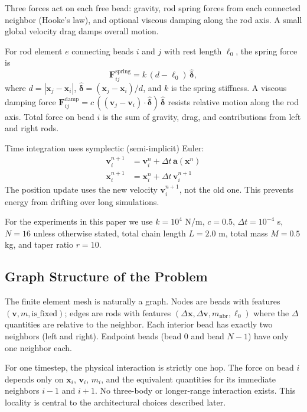 \documentclass[conference]{IEEEtran}
\begin{document}
Three forces act on each free bead: gravity, rod spring forces from each connected neighbor (Hooke's law), and optional viscous damping along the rod axis. A small global velocity drag damps overall motion.

For rod element $e$ connecting beads $i$ and $j$ with rest length $\ell_0$, the spring force is
\begin{equation}
    \mathbf{F}_{ij}^{\text{spring}} = k \, (d - \ell_0) \, \hat{\boldsymbol{\delta}},
    \label{eq:spring}
\end{equation}
where $d = |\mathbf{x}_j - \mathbf{x}_i|$, $\hat{\boldsymbol{\delta}} = (\mathbf{x}_j - \mathbf{x}_i)/d$, and $k$ is the spring stiffness. A viscous damping force $\mathbf{F}_{ij}^{\text{damp}} = c \, ((\mathbf{v}_j - \mathbf{v}_i) \cdot \hat{\boldsymbol{\delta}}) \, \hat{\boldsymbol{\delta}}$ resists relative motion along the rod axis. Total force on bead $i$ is the sum of gravity, drag, and contributions from left and right rods.

Time integration uses symplectic (semi-implicit) Euler:
\begin{align}
    \mathbf{v}_i^{n+1} &= \mathbf{v}_i^n + \Delta t \, \mathbf{a}(\mathbf{x}^n) \label{eq:symp_v}\\
    \mathbf{x}_i^{n+1} &= \mathbf{x}_i^n + \Delta t \, \mathbf{v}_i^{n+1} \label{eq:symp_x}
\end{align}
The position update uses the new velocity $\mathbf{v}_i^{n+1}$, not the old one. This prevents energy from drifting over long simulations.

For the experiments in this paper we use $k = 10^4$ N/m, $c = 0.5$, $\Delta t = 10^{-4}$ s, $N = 16$ unless otherwise stated, total chain length $L = 2.0$ m, total mass $M = 0.5$ kg, and taper ratio $r = 10$.

\subsection{Graph Structure of the Problem}

The finite element mesh is naturally a graph. Nodes are beads with features $(\mathbf{v}, m, \text{is\_fixed})$; edges are rods with features $(\Delta\mathbf{x}, \Delta\mathbf{v}, m_{\text{nbr}}, \ell_0)$ where the $\Delta$ quantities are relative to the neighbor. Each interior bead has exactly two neighbors (left and right). Endpoint beads (bead 0 and bead $N-1$) have only one neighbor each.

For one timestep, the physical interaction is strictly one hop. The force on bead $i$ depends only on $\mathbf{x}_i$, $\mathbf{v}_i$, $m_i$, and the equivalent quantities for its immediate neighbors $i-1$ and $i+1$. No three-body or longer-range interaction exists. This locality is central to the architectural choices described later.
\end{document}

